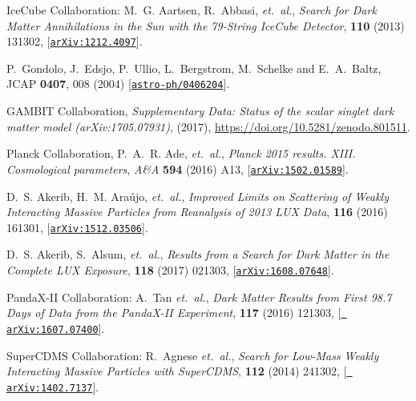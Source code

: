 \documentclass{PoS}
\newcommand{\GB}{\textsf{GAMBIT}\xspace}
\begin{document}
\begin{thebibliography}{99}
IceCube Collaboration: M.~G. {Aartsen}, R.~{Abbasi}, {\em et.~al.}, {\it
  {Search for Dark Matter Annihilations in the Sun with the 79-String IceCube
  Detector}},  {\em \prl} {\bf 110} (2013) 131302,
  [\href{http://arxiv.org/abs/1212.4097}{{\tt arXiv:1212.4097}}].

  P.~Gondolo, J.~Edsjo, P.~Ullio, L.~Bergstrom, M.~Schelke and E.~A.~Baltz,
  JCAP {\bf 0407}, 008 (2004)
       [\href{https://arxiv.org/abs/astro-ph/0406204}{{\tt astro-ph/0406204}}].

\GB Collaboration, \textit{Supplementary Data: Status of the scalar singlet
  dark matter model (arXiv:1705.07931)}, (2017),
  \href{https://doi.org/10.5281/zenodo.801511}{https://doi.org/10.5281/zenodo.801511}.

{Planck Collaboration}, P.~A.~R. {Ade}, {\em et.~al.}, {\it {Planck 2015
  results. XIII. Cosmological parameters}},  {\em A\&A} {\bf 594} (2016) A13,
  [\href{http://arxiv.org/abs/1502.01589}{{\tt arXiv:1502.01589}}].


D.~S. {Akerib}, H.~M. {Ara{\'u}jo}, {\em et.~al.}, {\it {Improved Limits on
  Scattering of Weakly Interacting Massive Particles from Reanalysis of 2013
  LUX Data}},  {\em \prl} {\bf 116} (2016) 161301,
  [\href{http://arxiv.org/abs/1512.03506}{{\tt arXiv:1512.03506}}].

D.~S. {Akerib}, S.~{Alsum}, {\em et.~al.}, {\it {Results from a Search for Dark
  Matter in the Complete LUX Exposure}},  {\em \prl} {\bf 118} (2017) 021303,
  [\href{http://arxiv.org/abs/1608.07648}{{\tt arXiv:1608.07648}}].

PandaX-II Collaboration: A.~Tan {\em et.~al.}, {\it {Dark Matter Results from
  First 98.7 Days of Data from the PandaX-II Experiment}},  {\em \prl} {\bf
  117} (2016) 121303, [\href{http://arxiv.org/abs/1607.07400}{{\tt
  arXiv:1607.07400}}].

SuperCDMS Collaboration: R.~Agnese {\em et.~al.}, {\it {Search for Low-Mass
  Weakly Interacting Massive Particles with SuperCDMS}},  {\em \prl} {\bf 112}
  (2014) 241302, [\href{http://arxiv.org/abs/1402.7137}{{\tt
  arXiv:1402.7137}}].


\end{thebibliography}
\end{document}
